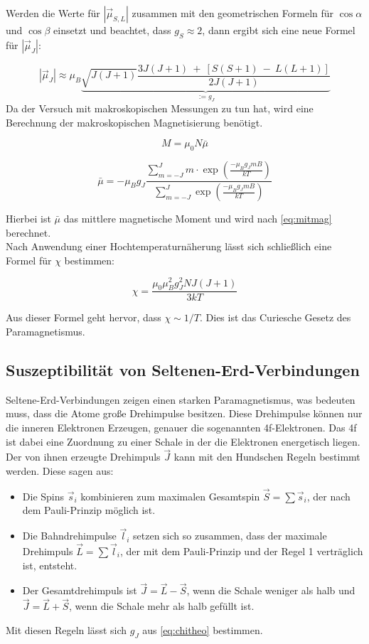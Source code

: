 Werden die Werte für $|\vec{\mu}_{S,L}|$ zusammen mit den geometrischen Formeln für $\cos\alpha$ und $\cos\beta$ einsetzt und beachtet, dass $g_S \approx 2$, dann ergibt sich eine neue Formel für $|\vec{\mu}_J|$:

\begin{equation}
    |\vec{\mu}_J| \approx \mu_B \underbrace{\sqrt{J(J+1)}\frac{3J(J+1)\ +\ [S(S+1)\ -\ L(L+1)]}{2J(J+1)}}_{:=g_J}
\end{equation}
Da der Versuch mit makroskopischen Messungen zu tun hat, wird eine Berechnung der makroskopischen Magnetisierung benötigt.

\begin{equation}
    M = \mu_0 N \bar{\mu}
\end{equation}

\begin{equation}
    \bar{\mu} = -\mu_Bg_J\frac{\sum_{m=-J}^J m\cdot \exp(\frac{-\mu_Bg_JmB}{kT})}{\sum_{m=-J}^J \exp(\frac{-\mu_Bg_JmB}{kT})}
    \label{eq:mitmag}
\end{equation}

Hierbei ist $\bar{\mu}$ das mittlere magnetische Moment und wird nach \autoref{eq:mitmag} berechnet.\\
Nach Anwendung einer Hochtemperaturnäherung lässt sich schließlich eine Formel für $\chi$ bestimmen:

\begin{equation}
    \chi = \frac{\mu_0 \mu_B^2 g_J^2 N J(J+1)}{3kT}
    \label{eq:chitheo}
\end{equation}

Aus dieser Formel geht hervor, dass $\chi \sim 1/T$. Dies ist das Curiesche Gesetz des Paramagnetismus.


\newpage
\subsection{Suszeptibilität von Seltenen-Erd-Verbindungen}
Seltene-Erd-Verbindungen zeigen einen starken Paramagnetismus, was bedeuten muss, dass die Atome große Drehimpulse besitzen.
Diese Drehimpulse können nur die inneren Elektronen Erzeugen, genauer die sogenannten 4f-Elektronen.
Das 4f ist dabei eine Zuordnung zu einer Schale in der die Elektronen energetisch liegen.\\
Der von ihnen erzeugte Drehimpuls $\vec{J}$ kann mit den Hundschen Regeln bestimmt werden.
Diese sagen aus:
\begin{itemize}
    \item Die Spins $\vec{s}_i$ kombinieren zum maximalen Gesamtspin $\vec{S} = \sum \vec{s}_i$, der nach dem Pauli-Prinzip möglich ist.
    \item Die Bahndrehimpulse $\vec{l}_i$ setzen sich so zusammen, dass der maximale Drehimpuls $\vec{L} = \sum \vec{l}_i$, der mit dem Pauli-Prinzip und der Regel 1 verträglich ist, entsteht.
    \item Der Gesamtdrehimpuls ist $\vec{J} = \vec{L}-\vec{S}$, wenn die Schale weniger als halb und $\vec{J} = \vec{L}+\vec{S}$, wenn die Schale mehr als halb gefüllt ist.
\end{itemize}
Mit diesen Regeln lässt sich $g_J$ aus \autoref{eq:chitheo} bestimmen.

